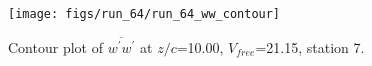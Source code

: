 \begin{figure}[H]
\centering
\texttt{[image: figs/run\_64/run\_64\_ww\_contour]}
\caption{Contour plot of $\overline{w^\prime w^\prime}$ at $z/c$=10.00, $V_{free}$=21.15, station 7.}
\label{fig:run_64_ww_contour}
\end{figure}


